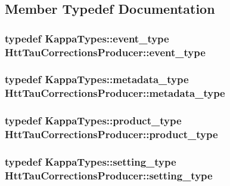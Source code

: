 \subsection{Member Typedef Documentation}
\hypertarget{classHttTauCorrectionsProducer_a5f98d673ed860926fc2f057a600839bc}{
\subsubsection[{event\_\-type}]{\setlength{\rightskip}{0pt plus 5cm}typedef KappaTypes::event\_\-type {\bf HttTauCorrectionsProducer::event\_\-type}}}
\label{classHttTauCorrectionsProducer_a5f98d673ed860926fc2f057a600839bc}
\hypertarget{classHttTauCorrectionsProducer_ae29469055ab934186c32520cefd75bb5}{
\subsubsection[{metadata\_\-type}]{\setlength{\rightskip}{0pt plus 5cm}typedef KappaTypes::metadata\_\-type {\bf HttTauCorrectionsProducer::metadata\_\-type}}}
\label{classHttTauCorrectionsProducer_ae29469055ab934186c32520cefd75bb5}
\hypertarget{classHttTauCorrectionsProducer_abc73e85eb18f55e8bee20a8c65c90cdc}{
\subsubsection[{product\_\-type}]{\setlength{\rightskip}{0pt plus 5cm}typedef KappaTypes::product\_\-type {\bf HttTauCorrectionsProducer::product\_\-type}}}
\label{classHttTauCorrectionsProducer_abc73e85eb18f55e8bee20a8c65c90cdc}
\hypertarget{classHttTauCorrectionsProducer_a710b2e9a72d130b031cafe041a85ea38}{
\subsubsection[{setting\_\-type}]{\setlength{\rightskip}{0pt plus 5cm}typedef KappaTypes::setting\_\-type {\bf HttTauCorrectionsProducer::setting\_\-type}}}
